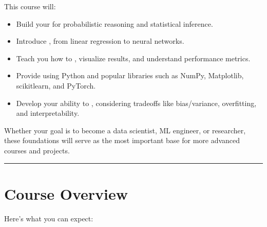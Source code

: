 \documentclass[letterpaper,10pt,english]{jupyterBook}
\begin{document}
\sphinxAtStartPar
This course will:
\begin{itemize}
\item {} 
\sphinxAtStartPar
Build your  for probabilistic reasoning and statistical inference.

\item {} 
\sphinxAtStartPar
Introduce , from linear regression to neural networks.

\item {} 
\sphinxAtStartPar
Teach you how to , visualize results, and understand performance metrics.

\item {} 
\sphinxAtStartPar
Provide  using Python and popular libraries such as NumPy, Matplotlib, scikit\sphinxhyphen{}learn, and PyTorch.

\item {} 
\sphinxAtStartPar
Develop your ability to , considering trade\sphinxhyphen{}offs like bias/variance, overfitting, and interpretability.

\end{itemize}

\sphinxAtStartPar
Whether your goal is to become a data scientist, ML engineer, or researcher, these foundations will serve as the most important base for more advanced courses and projects.


\bigskip\hrule\bigskip



\section{Course Overview}
\label{\detokenize{introduction:course-overview}}
\sphinxAtStartPar
Here’s what you can expect:
\end{document}
